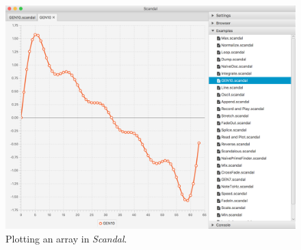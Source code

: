 \begin{figure}[b!]
	\includegraphics[width=4.5in]{img/plot}
	\caption[Plotting an array in \emph{Scandal}.]{Plotting an array in \emph{Scandal}.}
\end{figure}